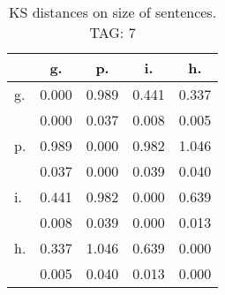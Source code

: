 \begin{table}[h!]
\begin{center}
\begin{tabular}{| l | c | c | c | c |}\hline
 & g. & p. & i. & h. \\\hline
g. & 0.000  & 0.989  & 0.441  & 0.337 \\\hline
 & 0.000  & 0.037  & 0.008  & 0.005 \\\hline
p. & 0.989  & 0.000  & 0.982  & 1.046 \\\hline
 & 0.037  & 0.000  & 0.039  & 0.040 \\\hline
i. & 0.441  & 0.982  & 0.000  & 0.639 \\\hline
 & 0.008  & 0.039  & 0.000  & 0.013 \\\hline
h. & 0.337  & 1.046  & 0.639  & 0.000 \\\hline
 & 0.005  & 0.040  & 0.013  & 0.000 \\\hline
\end{tabular}
\caption{KS distances on size of sentences. TAG: 7}
\end{center}
\end{table}
